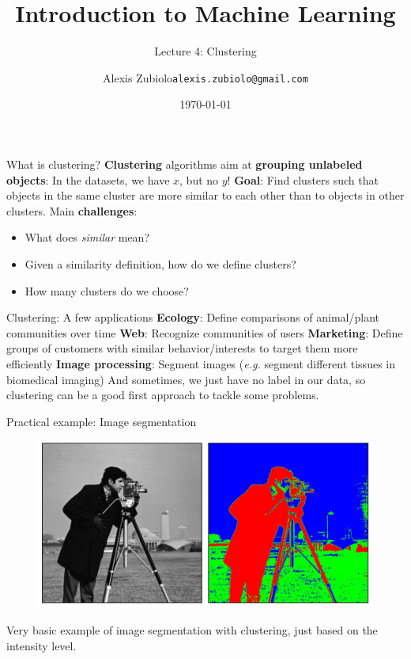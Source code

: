 \documentclass{beamer}
\title[Classification]{Introduction to Machine Learning}
\subtitle{Lecture 4: Clustering}
\author{Alexis Zubiolo\newline\texttt{alexis.zubiolo@gmail.com}}
\institute{Data Science Team Lead @ Adcash}
\date{\today}
\begin{document}
\begin{frame}
  \titlepage
\end{frame}

\begin{frame}{What is clustering?}
\textbf{Clustering} algorithms aim at \textbf{grouping unlabeled objects}: In the datasets, we have $x$, but no $y$!
\vfill
\pause
\textbf{Goal}: Find clusters such that objects in the same cluster are more similar to each other than to objects in other clusters.
\pause
\vfill
Main \textbf{challenges}:
\begin{itemize}
	\item What does \textit{similar} mean?
	\item Given a similarity definition, how do we define clusters?
	\item How many clusters do we choose?
\end{itemize}
\end{frame}

\begin{frame}{Clustering: A few applications}
\textbf{Ecology}: Define comparisons of animal/plant communities over time
\vfill
\textbf{Web}: Recognize communities of users
\vfill
\textbf{Marketing}: Define groups of customers with similar behavior/interests to target them more efficiently
\vfill
\textbf{Image processing}: Segment images (\textit{e.g.} segment different tissues in biomedical imaging)
\vfill
And sometimes, we just have no label in our data, so clustering can be a good first approach to tackle some problems.
\end{frame}

\begin{frame}{Practical example: Image segmentation}
\centering
\begin{figure}
\includegraphics[width=\textwidth]{images/segmentation.jpg}
\end{figure}
Very basic example of image segmentation with clustering, just based on the intensity level.
\end{frame}
\end{document}
